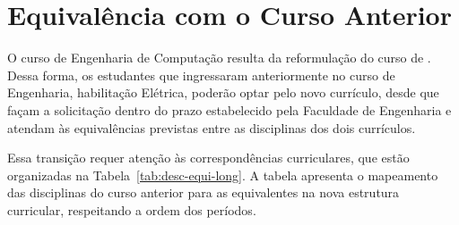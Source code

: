 \section{Equivalência com o Curso Anterior}

O curso de Engenharia de Computação resulta da reformulação do curso de \cursoatual. Dessa forma, os estudantes que ingressaram anteriormente no curso de Engenharia, habilitação Elétrica, poderão optar pelo novo currículo, desde que façam a solicitação dentro do prazo estabelecido pela Faculdade de Engenharia e atendam às equivalências previstas entre as disciplinas dos dois currículos.

Essa transição requer atenção às correspondências curriculares, que estão organizadas na Tabela~\ref{tab:desc-equi-long}. A tabela apresenta o mapeamento das disciplinas do curso anterior para as equivalentes na nova estrutura curricular, respeitando a ordem dos períodos.

